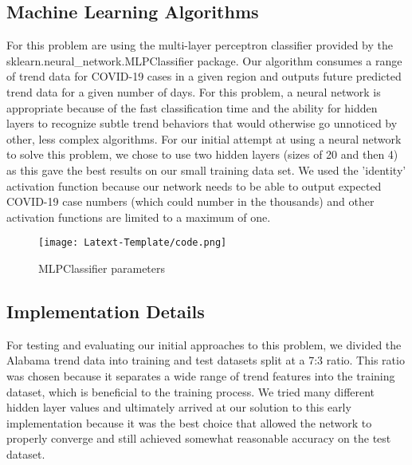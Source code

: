 \documentclass[conference]{IEEEtran}
\begin{document}
\subsection{Machine Learning Algorithms}
For this problem are using the multi-layer perceptron classifier provided by the sklearn.neural\_network.MLPClassifier package. Our algorithm consumes a range of trend data for COVID-19 cases in a given region and outputs future predicted trend data for a given number of days. For this problem, a neural network is appropriate because of the fast classification time and the ability for hidden layers to recognize subtle trend behaviors that would otherwise go unnoticed by other, less complex algorithms. For our initial attempt at using a neural network to solve this problem, we chose to use two hidden layers (sizes of 20 and then 4) as this gave the best results on our small training data set. We used the 'identity' activation function because our network needs to be able to output expected COVID-19 case numbers (which could number in the thousands) and other activation functions are limited to a maximum of one.

\begin{figure}
    \centering
    \texttt{[image: Latext-Template/code.png]}
    \caption{MLPClassifier parameters}
    \label{fig:MLPClassifier_code}
\end{figure}

\subsection{Implementation Details}
For testing and evaluating our initial approaches to this problem, we divided the Alabama trend data into training and test datasets split at a 7:3 ratio. This ratio was chosen because it separates a wide range of trend features into the training dataset, which is beneficial to the training process. We tried many different hidden layer values and ultimately arrived at our solution to this early implementation because it was the best choice that allowed the network to properly converge and still achieved somewhat reasonable accuracy on the test dataset.
\end{document}
